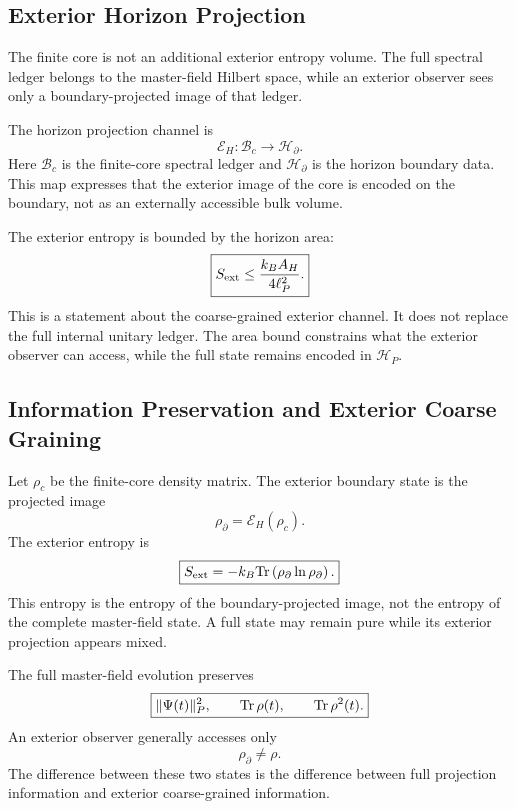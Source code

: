 \documentclass[11pt]{article}
\begin{document}
\subsection{Exterior Horizon Projection}

The finite core is not an additional exterior entropy volume. The full spectral
ledger belongs to the master-field Hilbert space, while an exterior observer
sees only a boundary-projected image of that ledger.

The horizon projection channel is
\begin{equation}
\boxed{
\mathcal E_H:
\mathcal B_c
\longrightarrow
\mathcal H_\partial.
}
\end{equation}
Here \(\mathcal B_c\) is the finite-core spectral ledger and
\(\mathcal H_\partial\) is the horizon boundary data. This map expresses that
the exterior image of the core is encoded on the boundary, not as an externally
accessible bulk volume.

The exterior entropy is bounded by the horizon area:
\begin{equation}
\boxed{
S_{\rm ext}
\leq
\frac{k_BA_H}{4\ell_P^2}.
}
\end{equation}
This is a statement about the coarse-grained exterior channel. It does not
replace the full internal unitary ledger. The area bound constrains what the
exterior observer can access, while the full state remains encoded in
\(\mathcal H_P\).

\subsection{Information Preservation and Exterior Coarse Graining}

Let \(\rho_c\) be the finite-core density matrix. The exterior boundary state is
the projected image
\begin{equation}
\boxed{
\rho_{\partial}
=
\mathcal E_H(\rho_c).
}
\end{equation}
The exterior entropy is
\begin{equation}
\boxed{
S_{\rm ext}
=
-k_B{\rm Tr}
\left(
\rho_{\partial}\ln\rho_{\partial}
\right).
}
\end{equation}
This entropy is the entropy of the boundary-projected image, not the entropy of
the complete master-field state. A full state may remain pure while its exterior
projection appears mixed.

The full master-field evolution preserves
\begin{equation}
\boxed{
\|\Psi(t)\|_P^2,
\qquad
{\rm Tr}\,\rho(t),
\qquad
{\rm Tr}\,\rho^2(t).
}
\end{equation}
An exterior observer generally accesses only
\begin{equation}
\boxed{
\rho_{\partial}
\neq
\rho.
}
\end{equation}
The difference between these two states is the difference between full
projection information and exterior coarse-grained information.
\end{document}
